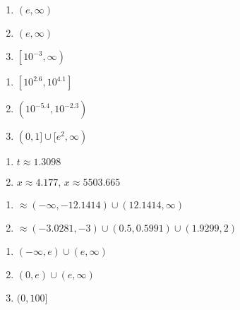 \documentclass{ximera}
\begin{document}
\begin{multicols}{3}
\begin{enumerate}
\setcounter{enumi}{\value{HW}}

\item $(e, \infty)$
\item $(e, \infty)$
\item $\left[10^{-3}, \infty \right)$

\setcounter{HW}{\value{enumi}}
\end{enumerate}
\end{multicols}

\begin{multicols}{3}
\begin{enumerate}
\setcounter{enumi}{\value{HW}}

\item $\left[10^{2.6}, 10^{4.1}\right]$

\item $\left(10^{-5.4}, 10^{-2.3}\right)$
\item $(0, 1] \cup [e^{2}, \infty)$

\setcounter{HW}{\value{enumi}}
\end{enumerate}
\end{multicols}

\begin{multicols}{2}
\begin{enumerate}
\setcounter{enumi}{\value{HW}}

\item $t \approx 1.3098$
\item $x \approx 4.177, \, x \approx 5503.665$

\setcounter{HW}{\value{enumi}}
\end{enumerate}
\end{multicols}

\begin{multicols}{2}
\begin{enumerate}
\setcounter{enumi}{\value{HW}}

\item $\approx (-\infty, -12.1414) \cup (12.1414, \infty)$
\item $\approx (-3.0281, -3) \cup (0.5, 0.5991) \cup (1.9299, 2)$

\setcounter{HW}{\value{enumi}}
\end{enumerate}
\end{multicols}

\begin{multicols}{3} 
\begin{enumerate}
\setcounter{enumi}{\value{HW}}

\item  $(-\infty, e) \cup (e, \infty)$

\item   $(0,e) \cup (e, \infty)$

\item  $(0, 100]$

\setcounter{HW}{\value{enumi}}
\end{enumerate}
\end{multicols}
\end{document}
